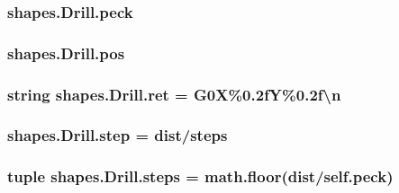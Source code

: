 \subsubsection[{peck}]{\setlength{\rightskip}{0pt plus 5cm}shapes.\+Drill.\+peck}\label{classshapes_1_1_drill_a514d5e174a3b7237d383669862b9158c}
\hypertarget{classshapes_1_1_drill_ade0cbf719eb083c1d709e8bd142ba09e}{}
\subsubsection[{pos}]{\setlength{\rightskip}{0pt plus 5cm}shapes.\+Drill.\+pos}\label{classshapes_1_1_drill_ade0cbf719eb083c1d709e8bd142ba09e}
\hypertarget{classshapes_1_1_drill_a82e27472f17f220aca47b1874ac1659d}{}
\subsubsection[{ret}]{\setlength{\rightskip}{0pt plus 5cm}string shapes.\+Drill.\+ret = \textquotesingle{}G0\+X\%0.\+2f\+Y\%0.\+2f\textbackslash{}n\textquotesingle{}\hspace{0.3cm}{\ttfamily [static]}}\label{classshapes_1_1_drill_a82e27472f17f220aca47b1874ac1659d}
\hypertarget{classshapes_1_1_drill_a65ebd9ebcb8ffdc2f1c4682b20821f33}{}
\subsubsection[{step}]{\setlength{\rightskip}{0pt plus 5cm}shapes.\+Drill.\+step = {\bf dist}/{\bf steps}\hspace{0.3cm}{\ttfamily [static]}}\label{classshapes_1_1_drill_a65ebd9ebcb8ffdc2f1c4682b20821f33}
\hypertarget{classshapes_1_1_drill_aba5c261914fcec674bd9b9c039aa53a5}{}
\subsubsection[{steps}]{\setlength{\rightskip}{0pt plus 5cm}tuple shapes.\+Drill.\+steps = math.\+floor({\bf dist}/self.\+peck)\hspace{0.3cm}{\ttfamily [static]}}\label{classshapes_1_1_drill_aba5c261914fcec674bd9b9c039aa53a5}
\hypertarget{classshapes_1_1_drill_a05155870584a057702ebfe0ad574a8bb}{}
